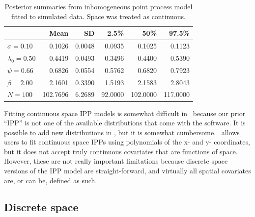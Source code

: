 \begin{table}[b]
\centering
\caption{Posterior summaries from inhomogeneous point process model
  fitted to simulated data. Space was treated as continuous.}
\begin{tabular}{lrrrrr}
\hline
& Mean & SD & 2.5\% & 50\% & 97.5\% \\
\hline
 $\sigma =0.10$ &   0.1026 &   0.0048 &   0.0935 &   0.1025 &   0.1123 \\
 $\lambda_0=0.50$ &   0.4419 &   0.0493 &   0.3496 &   0.4400 &   0.5390 \\
 $\psi =0.66$ &   0.6826 &   0.0554 &   0.5762 &   0.6820 &   0.7923 \\
 $\beta =2.00$ &   2.1601 &   0.3390 &   1.5193 &   2.1583 &   2.8043 \\
 $N =100$ & 102.7696 &   6.2689 &  92.0000 & 102.0000 & 117.0000 \\
\hline
\end{tabular}
\label{ch9.tab.simIPP}
\end{table}


Fitting continuous space IPP models is somewhat
difficult in \bugs~because our prior ``IPP'' is not one of the
available distributions that come with the software. It is
possible to add new distributions in \bugs, but it is somewhat
cumbersome.  \secr~allows
users to fit continuous space IPPs using polynomials of the x- and y-
coordinates, but it does not accept truly continuous covariates that
are functions of space. However, these
are not really important limitations because discrete
space versions of the IPP model are straight-forward, and virtually all spatial
covariates are, or can be, defined as such.


\subsection{Discrete space}
\label{modeling.sec.discrete}


